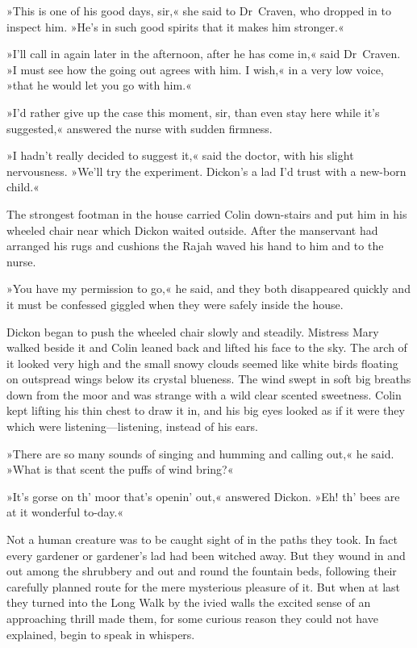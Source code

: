 »This is one of his good days, sir,« she said to Dr~Craven, who dropped in to inspect him. »He's in such good spirits that it makes him stronger.«

»I'll call in again later in the afternoon, after he has come in,« said Dr~Craven. »I must see how the going out agrees with him. I wish,« in a very low voice, »that he would let you go with him.«

»I'd rather give up the case this moment, sir, than even stay here while it's suggested,« answered the nurse with sudden firmness.

»I hadn't really decided to suggest it,« said the doctor, with his slight nervousness. »We'll try the experiment. Dickon's a lad I'd trust with a new-born child.«

The strongest footman in the house carried Colin down-stairs and put him in his wheeled chair near which Dickon waited outside. After the manservant had arranged his rugs and cushions the Rajah waved his hand to him and to the nurse.

»You have my permission to go,« he said, and they both disappeared quickly and it must be confessed giggled when they were safely inside the house.

Dickon began to push the wheeled chair slowly and steadily. Mistress Mary walked beside it and Colin leaned back and lifted his face to the sky. The arch of it looked very high and the small snowy clouds seemed like white birds floating on outspread wings below its crystal blueness. The wind swept in soft big breaths down from the moor and was strange with a wild clear scented sweetness. Colin kept lifting his thin chest to draw it in, and his big eyes looked as if it were they which were listening—listening, instead of his ears.

»There are so many sounds of singing and humming and calling out,« he said. »What is that scent the puffs of wind bring?«

»It's gorse on th' moor that's openin' out,« answered Dickon. »Eh! th' bees are at it wonderful to-day.«

Not a human creature was to be caught sight of in the paths they took. In fact every gardener or gardener's lad had been witched away. But they wound in and out among the shrubbery and out and round the fountain beds, following their carefully planned route for the mere mysterious pleasure of it. But when at last they turned into the Long Walk by the ivied walls the excited sense of an approaching thrill made them, for some curious reason they could not have explained, begin to speak in whispers.

